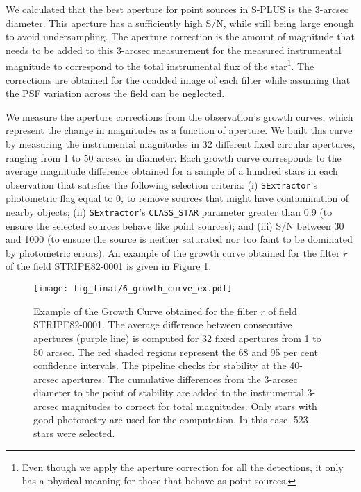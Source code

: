 \documentclass[fleqn,usenatbib]{mnras}
\begin{document}
We calculated that the best aperture for point sources in S-PLUS is the 3-arcsec diameter. This aperture has a sufficiently high S/N, while still being large enough to avoid undersampling. The aperture correction is the amount of magnitude that needs to be added to this 3-arcsec measurement for the measured instrumental magnitude to correspond to the total instrumental flux of the star\footnote{Even though we apply the aperture correction for all the detections, it only has a physical meaning for those that behave as point sources.}. The corrections are obtained for the coadded image of each filter while assuming that the PSF variation across the field can be neglected. 

We measure the aperture corrections from the observation's growth curves, which represent the change in magnitudes as a function of aperture. We built this curve by measuring the instrumental magnitudes in 32 different fixed circular apertures, ranging from 1 to 50 arcsec in diameter. Each growth curve corresponds to the average magnitude difference obtained for a sample of a hundred stars in each observation that satisfies the following selection criteria: (i) \texttt{SExtractor}'s photometric flag equal to 0, to remove sources that might have contamination of nearby objects; (ii) \texttt{SExtractor}'s \texttt{CLASS\_STAR} parameter greater than 0.9 (to ensure the selected sources behave like point sources); and (iii) S/N between 30 and 1000 (to ensure the source is neither saturated nor too faint to be dominated by photometric errors). An example of the growth curve obtained for the filter $r$ of the field STRIPE82-0001 is given in Figure \ref{fig:example_growth_curve}.

\begin{figure}
\begin{center}
\texttt{[image: fig\_final/6\_growth\_curve\_ex.pdf]}
\caption{\label{fig:example_growth_curve}Example of the Growth Curve obtained for the filter $r$ of field STRIPE82-0001. The average difference between consecutive apertures (purple line) is computed for 32 fixed apertures from 1 to 50 arcsec. The red shaded regions represent the 68 and 95 per cent confidence intervals. The pipeline checks for stability at the 40-arcsec apertures. The cumulative differences from the 3-arcsec diameter to the point of stability are added to the instrumental 3-arcsec magnitudes to correct for total magnitudes. Only stars with good photometry are used for the computation. In this case, 523 stars were selected.} 
\end{center}
\end{figure}
\end{document}
